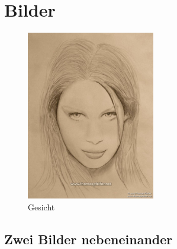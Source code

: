 \section{Bilder}
\label{sec:Bilder}

\lipsum[1]
\begin{figure}[h]
	\centering
		\includegraphics[width=0.50\textwidth]{bilder/bilder.jpg}
	\caption{Gesicht}
	\label{fig:bilder}
\end{figure}
\lipsum[1-2]

\subsection{Zwei Bilder nebeneinander}
\label{sec:ZweiBilderNebeneinander}

\lipsum[1]

